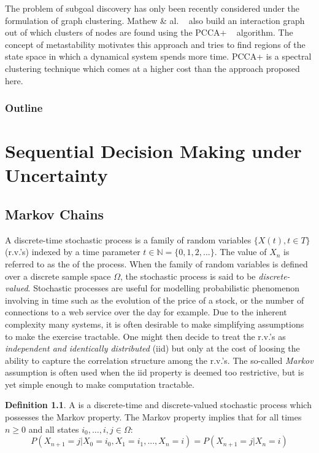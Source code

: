 \documentclass[12pt, oneside, extrafontsizes]{memoir}  %
\newcommand{\rvs}{r.v.'s\xspace}
\newcommand{\termidx}[1]{\index{#1}{\textbf{#1}}}
\theoremstyle{plain}
\theoremstyle{definition}
\newtheorem{defn}{Definition}[section]
\begin{document}
The problem of subgoal discovery has only been recently considered under the
formulation of graph clustering. Mathew \& al. ~\cite{Mathew2012} also build an
interaction graph out of which clusters of nodes are found using the PCCA+
~\cite{Weber2004} algorithm. The concept of metastability motivates this approach
and tries to find regions of the state space in which a dynamical system spends more
time. PCCA+ is a spectral clustering technique which comes at a higher cost than the
approach proposed here.

\subsection{Outline}
\chapter{Sequential Decision Making under Uncertainty}


\section{Markov Chains}

A discrete-time stochastic process is a family of random variables $\{ X(t), t \in T\}$
(\rvs) indexed by a time parameter $t \in \mathbb{N} = \{0, 1, 2,...\}$. The
value of $X_n$ is referred to as the \termidx{state} of the process. When the family of
random variables is defined over a discrete sample space
$\Omega$, the stochastic process is said to be \textit{discrete-valued}.
Stochastic processes are useful for modelling probabilistic phenomenon involving in
time such as the evolution of the price of a stock, or the
number of connections to a web service over the day for example. Due to the inherent
complexity many systems, it is often desirable to make simplifying assumptions to
make the exercise tractable. One might then decide to treat the \rvs as
\textit{independent and identically distributed} (iid) but only at the cost of loosing the ability to
capture the correlation structure among the \rvs. The so-called \textit{Markov}
assumption is often used when the iid property is deemed too restrictive, but is yet
simple enough to make computation tractable.

\begin{defn}
A \termidx{Markov Chain} is a discrete-time and discrete-valued stochastic process
which possesses the Markov property. The Markov property implies that for all times $n \geq
0$ and all states $i_0, \dots, i, j \in \Omega$:
\begin{equation}
P(X_{n+1} = j | X_0 = i_0, X_1 = i_1, ..., X_n = i) = P( X_{n+1} = j | X_n = i)
\end{equation}
\end{defn}
\end{document}
